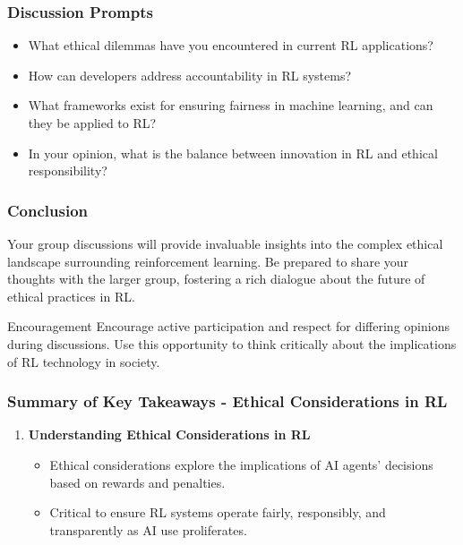 \documentclass[aspectratio=169]{beamer}
\begin{document}
\begin{frame}[fragile]
  \frametitle{Discussion Prompts}
  \begin{itemize}
    \item What ethical dilemmas have you encountered in current RL applications?
    \item How can developers address accountability in RL systems?
    \item What frameworks exist for ensuring fairness in machine learning, and can they be applied to RL?
    \item In your opinion, what is the balance between innovation in RL and ethical responsibility?
  \end{itemize}
\end{frame}

\begin{frame}[fragile]
  \frametitle{Conclusion}
  Your group discussions will provide invaluable insights into the complex ethical landscape surrounding reinforcement learning. Be prepared to share your thoughts with the larger group, fostering a rich dialogue about the future of ethical practices in RL.
  
  \vspace{1em}
  \begin{block}{Encouragement}
    Encourage active participation and respect for differing opinions during discussions. Use this opportunity to think critically about the implications of RL technology in society.
  \end{block}
\end{frame}

\begin{frame}[fragile]
    \frametitle{Summary of Key Takeaways - Ethical Considerations in RL}
    \begin{enumerate}
        \item \textbf{Understanding Ethical Considerations in RL}
            \begin{itemize}
                \item Ethical considerations explore the implications of AI agents' decisions based on rewards and penalties.
                \item Critical to ensure RL systems operate fairly, responsibly, and transparently as AI use proliferates.
            \end{itemize}
    \end{enumerate}
\end{frame}
\end{document}
